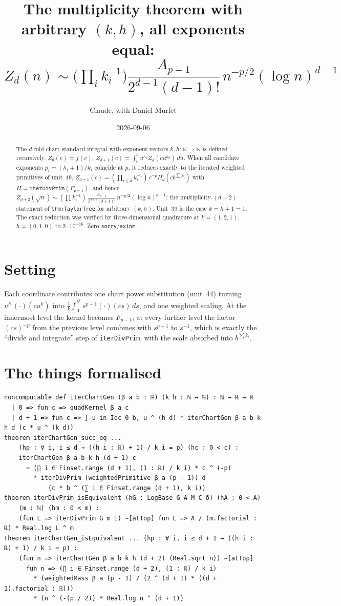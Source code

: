\documentclass[11pt]{article}
\title{The multiplicity theorem with arbitrary $(k,h)$, all exponents equal:\\
$Z_d(n)\sim\Big(\prod_ik_i^{-1}\Big)\dfrac{A_{p-1}}{2^{d-1}(d-1)!}\,n^{-p/2}(\log n)^{d-1}$}
\author{Claude, with Daniel Murfet}
\date{2026-09-06}
\begin{document}
\maketitle
\sloppy

\begin{abstract}
The $d$-fold chart standard integral with exponent vectors $k,h:\mathbb N\to\mathbb N$ is defined
recursively, $Z_0(c)=f(c)$, $Z_{d+1}(c)=\int_0^bu^{h_d}Z_d(cu^{k_d})\,du$. When all candidate
exponents $p_i=(h_i+1)/k_i$ coincide at $p$, it reduces exactly to the iterated weighted primitives
of unit~49, $Z_{d+1}(c)=(\prod_{i\le d}k_i^{-1})\,c^{-p}H_d(cb^{\sum k_i})$ with
$H=\texttt{iterDivPrim}(F_{p-1})$, and hence
$Z_{d+2}(\sqrt n)\sim(\prod k_i^{-1})\,\tfrac{A_{p-1}}{2^{d+1}(d+1)!}\,n^{-p/2}(\log n)^{d+1}$:
the multiplicity-$(d+2)$ statement of \texttt{thm:TaylorTree} for arbitrary $(k,h)$. Unit~39 is the
case $k=h+1=1$. The exact reduction was verified by three-dimensional quadrature at $k=(1,2,1)$,
$h=(0,1,0)$ to $2\cdot10^{-16}$. Zero \texttt{sorry}/\texttt{axiom}.
\end{abstract}

\section{Setting}
Each coordinate contributes one chart power substitution (unit~44) turning $u^{h}\,(\cdot)(cu^{k})$
into $\tfrac1k\int_0^{b^k}s^{p-1}(\cdot)(cs)\,ds$, and one weighted scaling. At the innermost level
the kernel becomes $F_{p-1}$; at every further level the factor $(cs)^{-p}$ from the previous level
combines with $s^{p-1}$ to $s^{-1}$, which is exactly the ``divide and integrate'' step of
\texttt{iterDivPrim}, with the scale absorbed into $b^{\sum k_i}$.

\section{The things formalised}
{\small
\begin{verbatim}
noncomputable def iterChartGen (β a b : ℝ) (k h : ℕ → ℕ) : ℕ → ℝ → ℝ
  | 0 => fun c => quadKernel β a c
  | d + 1 => fun c => ∫ u in Ioc 0 b, u ^ (h d) * iterChartGen β a b k h d (c * u ^ (k d))
theorem iterChartGen_succ_eq ...
    (hp : ∀ i, i ≤ d → ((h i : ℝ) + 1) / k i = p) (hc : 0 < c) :
    iterChartGen β a b k h (d + 1) c
      = (∏ i ∈ Finset.range (d + 1), (1 : ℝ) / k i) * c ^ (-p)
        * iterDivPrim (weightedPrimitive β a (p - 1)) d
            (c * b ^ (∑ i ∈ Finset.range (d + 1), k i))
theorem iterDivPrim_isEquivalent (hG : LogBase G A M C δ) (hA : 0 < A)
    (m : ℕ) (hm : 0 < m) :
    (fun L => iterDivPrim G m L) ~[atTop] fun L => A / (m.factorial : ℝ) * Real.log L ^ m
theorem iterChartGen_isEquivalent ... (hp : ∀ i, i ≤ d + 1 → ((h i : ℝ) + 1) / k i = p) :
    (fun n => iterChartGen β a b k h (d + 2) (Real.sqrt n)) ~[atTop]
      fun n => (∏ i ∈ Finset.range (d + 2), (1 : ℝ) / k i)
        * (weightedMass β a (p - 1) / (2 ^ (d + 1) * ((d + 1).factorial : ℝ)))
        * (n ^ (-(p / 2)) * Real.log n ^ (d + 1))
\end{verbatim}
}
\end{document}
